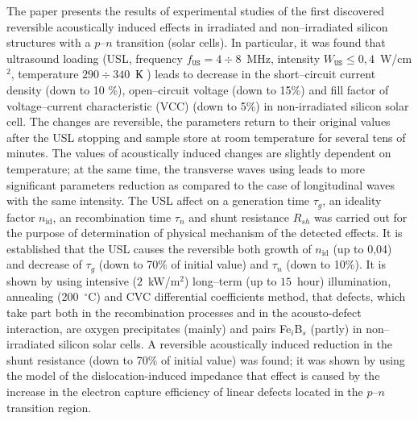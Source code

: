 The paper presents the results of experimental studies of the first discovered reversible acoustically induced effects in irradiated and non--irradiated silicon structures with a $p$--$n$ transition (solar cells).
In particular, it was found that ultrasound loading (USL, frequency $f_\mathtt{US}=4\div8$~MHz, intensity $W_\mathtt{US}\leq0,4$~W/cm$^2$, temperature $290\div340$~К ) leads to decrease in the short--circuit current density (down to 10 \%), open--circuit voltage (down to 15\%) and fill factor of voltage--current characteristic (VCC) (down to 5\%) in non-irradiated silicon solar cell.
The changes are reversible, the parameters return to their original values after the USL stopping and sample store at room temperature for several tens of minutes.
The values of acoustically induced changes are slightly dependent on temperature;
at the same time, the transverse waves using leads to more significant parameters reduction as compared to the case of longitudinal waves with the same intensity.
The USL affect on a generation time $\tau_{g}$,
an ideality factor $n_\mathrm{id}$,
an recombination time $\tau_n$
and shunt resistance $R_{sh}$ was carried out for the purpose of determination of physical mechanism of the detected effects.
It is established that the USL causes the reversible both growth of $n_\mathrm{id}$  (up to 0,04) and
decrease of $\tau_g$ (down to 70\% of initial value) and $\tau_n$ (down to 10\%).
It is shown by using intensive ($2$~kW/m$^2$) long--term (up to $15$~hour) illumination,
annealing (200~$^\circ$C) and
CVC differential coefficients  method,
that defects, which take part both in the recombination processes and in the acousto-defect interaction, are oxygen precipitates  (mainly) and
pairs Fe$_i$B$_s$ (partly) in non--irradiated silicon solar cells.
A reversible acoustically induced reduction in the shunt resistance (down to 70\% of initial value) was found;
it was shown by  using the model of the dislocation-induced impedance that effect is caused by the increase in the electron capture efficiency of linear defects located in the $p$--$n$ transition region.


